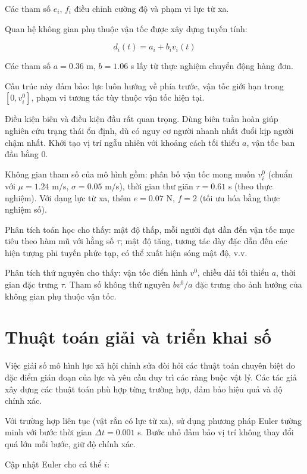\documentclass[12pt,a4paper]{article}
\begin{document}
Các tham số $e_i$, $f_i$ điều chỉnh cường độ và phạm vi lực từ xa.

Quan hệ không gian phụ thuộc vận tốc được xây dựng tuyến tính:

\begin{equation}
d_i(t) = a_i + b_i v_i(t)
\end{equation}

Các tham số $a = 0.36$ m, $b = 1.06$ s lấy từ thực nghiệm chuyển động hàng đơn.

Cấu trúc này đảm bảo: lực luôn hướng về phía trước, vận tốc giới hạn trong $[0, v_i^0]$, phạm vi tương tác tùy thuộc vận tốc hiện tại.

Điều kiện biên và điều kiện đầu rất quan trọng. Dùng biên tuần hoàn giúp nghiên cứu trạng thái ổn định, dù có nguy cơ người nhanh nhất đuổi kịp người chậm nhất. Khởi tạo vị trí ngẫu nhiên với khoảng cách tối thiểu $a$, vận tốc ban đầu bằng 0.

Không gian tham số của mô hình gồm: phân bố vận tốc mong muốn $v_i^0$ (chuẩn với $\mu = 1.24$ m/s, $\sigma = 0.05$ m/s), thời gian thư giãn $\tau = 0.61$ s (theo thực nghiệm). Với dạng lực từ xa, thêm $e = 0.07$ N, $f = 2$ (tối ưu hóa bằng thực nghiệm số).

Phân tích toán học cho thấy: mật độ thấp, mỗi người đạt dần đến vận tốc mục tiêu theo hàm mũ với hằng số $\tau$; mật độ tăng, tương tác dày đặc dẫn đến các hiện tượng phi tuyến phức tạp, có thể xuất hiện sóng mật độ, v.v.

Phân tích thứ nguyên cho thấy: vận tốc điển hình $v^0$, chiều dài tối thiểu $a$, thời gian đặc trưng $\tau$. Tham số không thứ nguyên $b v^0 / a$ đặc trưng cho ảnh hưởng của không gian phụ thuộc vận tốc.

\section{Thuật toán giải và triển khai số}

Việc giải số mô hình lực xã hội chỉnh sửa đòi hỏi các thuật toán chuyên biệt do đặc điểm gián đoạn của lực và yêu cầu duy trì các ràng buộc vật lý. Các tác giả xây dựng các thuật toán phù hợp từng trường hợp, đảm bảo hiệu quả và độ chính xác.

Với trường hợp liên tục (vật rắn có lực từ xa), sử dụng phương pháp Euler tường minh với bước thời gian $\Delta t = 0.001$ s. Bước nhỏ đảm bảo vị trí không thay đổi quá lớn mỗi bước, giữ độ chính xác.

Cập nhật Euler cho cá thể $i$:
\end{document}
